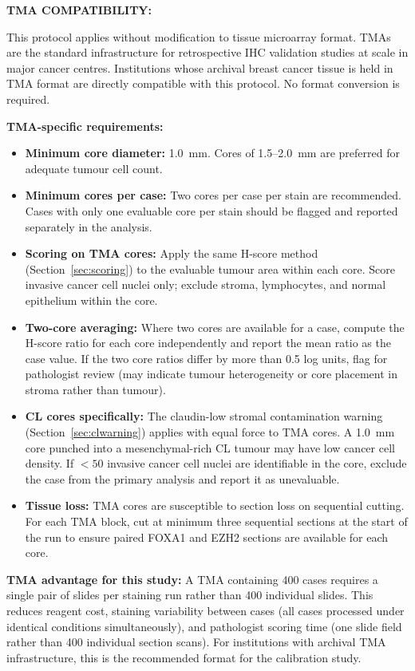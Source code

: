\documentclass[11pt, a4paper]{article}
\begin{document}
\begin{mdframed}[backgroundcolor=tmabox,
                 linecolor=blue!50!black,
                 linewidth=1pt]
\textbf{TMA COMPATIBILITY:}

This protocol applies without modification to
tissue microarray format. TMAs are the standard
infrastructure for retrospective IHC validation
studies at scale in major cancer centres.
Institutions whose archival breast cancer tissue
is held in TMA format are directly compatible
with this protocol. No format conversion is
required.

\textbf{TMA-specific requirements:}
\begin{itemize}[noitemsep]
    \item \textbf{Minimum core diameter:}
    1.0~mm. Cores of 1.5--2.0~mm are
    preferred for adequate tumour cell
    count.
    \item \textbf{Minimum cores per case:}
    Two cores per case per stain are
    recommended. Cases with only one
    evaluable core per stain should be
    flagged and reported separately in
    the analysis.
    \item \textbf{Scoring on TMA cores:}
    Apply the same H-score method
    (Section~\ref{sec:scoring}) to the
    evaluable tumour area within each
    core. Score invasive cancer cell
    nuclei only; exclude stroma,
    lymphocytes, and normal epithelium
    within the core.
    \item \textbf{Two-core averaging:}
    Where two cores are available for a
    case, compute the H-score ratio for
    each core independently and report
    the mean ratio as the case value.
    If the two core ratios differ by
    more than 0.5 log units, flag for
    pathologist review (may indicate
    tumour heterogeneity or core
    placement in stroma rather than
    tumour).
    \item \textbf{CL cores specifically:}
    The claudin-low stromal contamination
    warning (Section~\ref{sec:clwarning})
    applies with equal force to TMA cores.
    A 1.0~mm core punched into a
    mesenchymal-rich CL tumour may have
    low cancer cell density. If $<50$
    invasive cancer cell nuclei are
    identifiable in the core, exclude
    the case from the primary analysis
    and report it as unevaluable.
    \item \textbf{Tissue loss:}
    TMA cores are susceptible to section
    loss on sequential cutting. For each
    TMA block, cut at minimum three
    sequential sections at the start
    of the run to ensure paired FOXA1
    and EZH2 sections are available
    for each core.
\end{itemize}

\textbf{TMA advantage for this study:}
A TMA containing 400 cases requires a single
pair of slides per staining run rather than
400 individual slides. This reduces reagent
cost, staining variability between cases
(all cases processed under identical conditions
simultaneously), and pathologist scoring time
(one slide field rather than 400 individual
section scans). For institutions with archival
TMA infrastructure, this is the recommended
format for the calibration study.
\end{mdframed}
\end{document}

